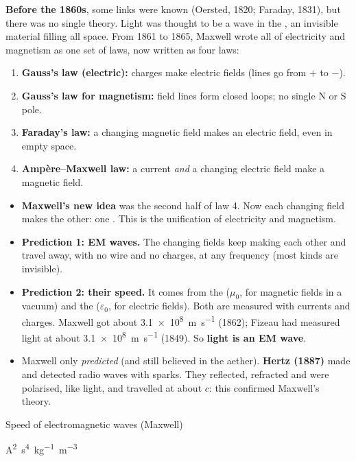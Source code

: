 \textbf{Before the 1860s}, some links were known (Oersted, 1820; Faraday, 1831), but there was
no single theory. Light was thought to be a wave in the , an invisible
material filling all space. From 1861 to 1865, Maxwell wrote all of electricity and magnetism as
one set of laws, now written as four laws:
\begin{enumerate}
  \item \textbf{Gauss's law (electric):} charges make electric fields (lines go from $+$ to $-$).
  \item \textbf{Gauss's law for magnetism:} field lines form closed loops; no single N or S pole.
  \item \textbf{Faraday's law:} a changing magnetic field makes an electric field, even in empty
        space.
  \item \textbf{Ampère--Maxwell law:} a current \emph{and} a changing electric field make a
        magnetic field.
\end{enumerate}

\begin{itemize}
  \item \textbf{Maxwell's new idea} was the second half of law 4. Now each changing field makes
        the other: one . This is the unification of
        electricity and magnetism.
  \item \textbf{Prediction 1: EM waves.} The changing fields keep making each other and travel
        away, with no wire and no charges, at any frequency (most kinds are invisible).
  \item \textbf{Prediction 2: their speed.} It comes from the 
        ($\mu_0$, for magnetic fields in a vacuum) and the 
        ($\varepsilon_0$, for electric fields). Both are measured with currents and charges. Maxwell
        got about \qty{3.1e8}{m.s^{-1}} (1862); Fizeau had measured light at about
        \qty{3.1e8}{m.s^{-1}} (1849). So \textbf{light is an EM wave}.
  \item Maxwell only \emph{predicted} (and still believed in the aether). \textbf{Hertz (1887)}
        made and detected radio waves with sparks. They reflected, refracted and were polarised,
        like light, and travelled at about $c$: this confirmed Maxwell's theory.
\end{itemize}

\begin{formulacard}[notonsheet]{Speed of electromagnetic waves (Maxwell)}
  \begin{symbols}
      {\si{A^2.s^4.kg^{-1}.m^{-3}}}
  \end{symbols}
\end{formulacard}

